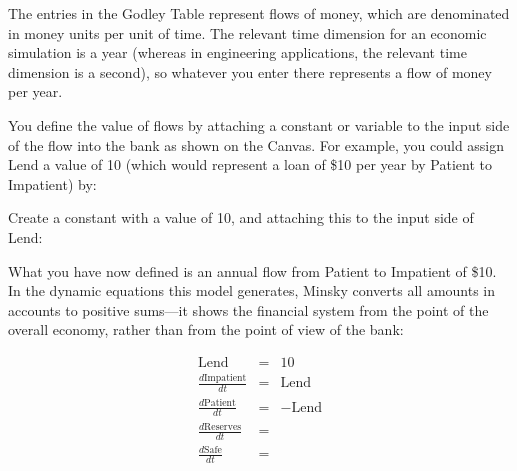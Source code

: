 The entries in the Godley Table represent flows of money, which are
denominated in money units per unit of time. The relevant time
dimension for an economic simulation is a year (whereas in engineering
applications, the relevant time dimension is a second), so whatever
you enter there represents a flow of money per year.


You define the value of flows by attaching a constant or variable to
the input side of the flow into the bank as shown on the Canvas. For
example, you could assign Lend a value of 10 (which would represent a
loan of \$10 per year by Patient to Impatient) by:



Create a constant with a value of 10, and attaching this to the input
side of Lend:

\begin{center}
\end{center}

What you have now defined is an annual flow from Patient to Impatient
of \$10. In the dynamic equations this model generates, Minsky
converts all amounts in accounts to positive sums---it shows the
financial system from the point of the overall economy, rather than
from the point of view of the bank:

\begin{eqnarray*}
\mathrm{Lend}&=&10\\
\frac{d\mathrm{Impatient}}{dt}&=&\mathrm{Lend}\\
\frac{d\mathrm{Patient}}{dt}&=&-\mathrm{Lend}\\
\frac{d\mathrm{Reserves}}{dt}&=&\\
\frac{d\mathrm{Safe}}{dt}&=&
\end{eqnarray*}



